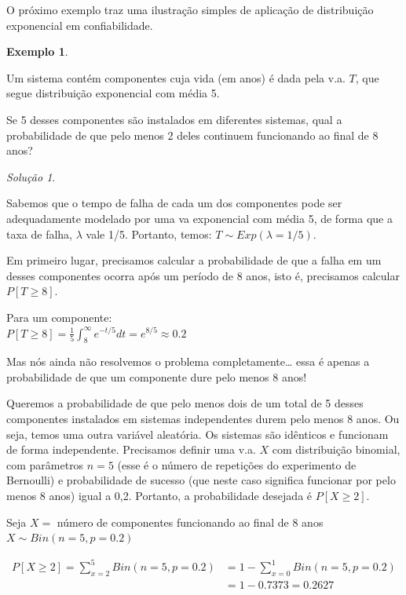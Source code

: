 \documentclass[
]{book}
\theoremstyle{definition}
\theoremstyle{definition}
\newtheorem{example}{Exemplo}[chapter]
\theoremstyle{definition}
\theoremstyle{remark}
\newtheorem*{solution}{Solução}
\begin{document}
O próximo exemplo traz uma ilustração simples de aplicação de distribuição exponencial em confiabilidade.

\begin{example}
\protect\hypertarget{exm:unnamed-chunk-5}{}{\label{exm:unnamed-chunk-5} }
\end{example}

Um sistema contém componentes cuja vida (em anos) é dada pela v.a. \(T\), que segue distribuição exponencial com média 5.

Se 5 desses componentes são instalados em diferentes sistemas, qual a probabilidade de que pelo menos 2 deles continuem funcionando ao final de 8 anos?

\begin{solution}
{}
\end{solution}

Sabemos que o tempo de falha de cada um dos componentes pode ser adequadamente modelado por uma va exponencial com média 5, de forma que a taxa de falha, \(\lambda\) vale 1/5. Portanto, temos: \(T \sim Exp(\lambda = 1/5)\).

Em primeiro lugar, precisamos calcular a probabilidade de que a falha em um desses componentes ocorra após um período de 8 anos, isto é, precisamos calcular \(P[T \geq 8]\).

Para um componente:\\
\(P[T \geq 8] = \frac{1}{5} \int_{8}^{\infty} e^{-t/5} dt = e^{8/5} \approx 0.2\)

Mas nós ainda não resolvemos o problema completamente\ldots{} essa é apenas a probabilidade de que um componente dure pelo menos 8 anos!

Queremos a probabilidade de que pelo menos dois de um total de 5 desses componentes instalados em sistemas independentes durem pelo menos 8 anos. Ou seja, temos uma outra variável aleatória. Os sistemas são idênticos e funcionam de forma independente. Precisamos definir uma v.a. \(X\) com distribuição binomial, com parâmetros \(n =5\) (esse é o número de repetições do experimento de Bernoulli) e probabilidade de sucesso (que neste caso significa funcionar por pelo menos 8 anos) igual a 0,2. Portanto, a probabilidade desejada é \(P[X \geq 2]\).

Seja \(X=\) número de componentes funcionando ao final de 8 anos\\
\(X \sim Bin(n = 5, p = 0.2)\)

\begin{align*}
  P[X \geq 2] = \sum_{x=2}^{5}Bin(n=5, p=0.2)
              &= 1- \sum_{x=0}^{1}Bin(n=5, p=0.2)\\
              &= 1 - 0.7373 = 0.2627\\  
\end{align*}
\end{document}
